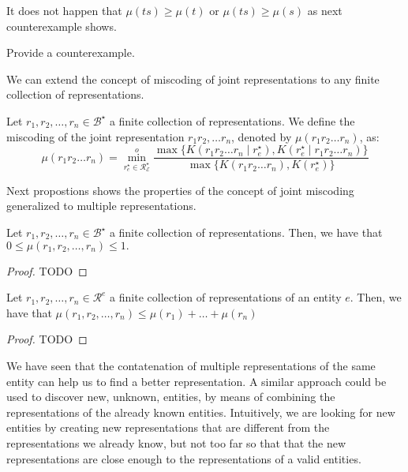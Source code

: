 It does not happen that $\mu(ts) \geq \mu(t)$ or $\mu(ts) \geq \mu(s)$ as next counterexample shows.

\begin{example}
{\color{red} Provide a counterexample.}
\end{example}

We can extend the concept of miscoding of joint representations to any finite collection of representations.

\begin{definition}
Let $r_1, r_2, \ldots, r_n \in \mathcal{B}^\star$ a finite collection of representations. We define the miscoding of the joint representation $r_1 r_2, \ldots r_n$, denoted by $\mu(r_1 r_2 \ldots r_n)$, as:
\[
\mu(r_1 r_2 \ldots r_n) = \overset{o}{ \underset{ r^\star_e \in \mathcal{R}^\star_\mathcal{E} } \min} \frac{ \max\{ K \left( r_1 r_2 \ldots r_n \mid r^\star_e \right), K \left( r^\star_e \mid r_1 r_2 \ldots r_n \right) \} } { \max\{ K \left( r_1 r_2 \ldots r_n \right), K \left( r^\star_e \right) \} }
\]
\end{definition}

Next propostions shows the properties of the concept of joint miscoding generalized to multiple representations.

\begin{proposition}
Let $r_1, r_2, \ldots, r_n \in \mathcal{B}^\star$ a finite collection of representations. Then, we have that $0 \leq \mu(r_1, r_2, \ldots, r_n) \leq 1.$
\end{proposition}
\begin{proof}
{\color{red} TODO}
\end{proof}

\begin{proposition}
Let $r_1, r_2, \ldots, r_n \in \mathcal{R}^e$ a finite collection of representations of an entity $e$. Then, we have that $\mu(r_1, r_2, \ldots, r_n) \leq \mu(r_1) + \ldots + \mu(r_n)$
\end{proposition}
\begin{proof}
{\color{red} TODO}
\end{proof}

We have seen that the contatenation of multiple representations of the same entity can help us to find a better representation. A similar approach could be used to discover new, unknown, entities, by means of combining the representations of the already known entities. Intuitively, we are looking for new entities by creating new representations that are different from the representations we already know, but not too far so that that the new representations are close enough to the representations of a valid entities.

